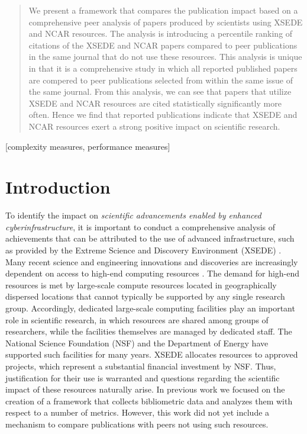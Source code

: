 \documentclass{sig-alternate}
\begin{document}
\begin{abstract}

We present a framework that compares the publication impact based on a comprehensive peer analysis of papers produced by scientists using XSEDE and NCAR resources. The analysis is introducing a percentile ranking of citations of the XSEDE and NCAR papers compared to peer publications in the same journal that do not use these resources.  This analysis is unique in that it is a comprehensive study in which all reported published papers are compered to peer publications selected from within the same issue of the same journal. From this analysis, we can see that papers that utilize XSEDE and NCAR resources are cited statistically significantly more often.  Hence we find that reported publications indicate that XSEDE and NCAR resources exert a strong positive impact on scientific research.

\end{abstract}


\vspace{-6pt}

[complexity measures,
performance measures]




\section{Introduction} 

To identify the impact on {\em scientific advancements enabled by enhanced cyberinfrastructure}, it is important to conduct a comprehensive analysis of achievements that can be attributed to the use of advanced infrastructure, such as provided by the Extreme Science and Discovery Environment (XSEDE) \cite{www-xsede,xsede}. Many recent science and engineering innovations and discoveries are increasingly dependent on access to high-end computing resources \cite{las14impact}. The demand for high-end resources is met by large-scale compute resources located in geographically dispersed locations that cannot typically be supported by any single research group. Accordingly, dedicated large-scale computing facilities play an important role in scientific research, in which resources are shared among groups of researchers, while the facilities themselves are managed by dedicated staff. The National Science Foundation (NSF) and the Department of Energy have supported such facilities for many years. XSEDE allocates resources to approved projects, which represent a substantial financial investment by NSF. Thus, justification for their use is warranted and questions regarding the scientific impact of these resources naturally arise. In previous work \cite{las14impact} we focused on the creation of a framework that collects bibliometric data and analyzes them with respect to a number of metrics. However, this work did not yet include a mechanism to compare publications with peers not using such resources.
\end{document}
